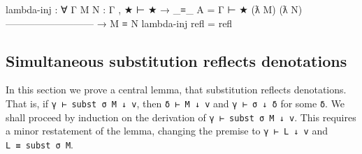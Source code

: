 \begin{fence}
\begin{code}
lambda-inj : ∀ {Γ} {M N : Γ , ★ ⊢ ★ }
  → _≡_ {A = Γ ⊢ ★} (ƛ M) (ƛ N)
    ---------------------------
  → M ≡ N
lambda-inj refl = refl
\end{code}
\end{fence}

\hypertarget{simultaneous-substitution-reflects-denotations}{%
\subsection{Simultaneous substitution reflects
denotations}\label{simultaneous-substitution-reflects-denotations}}

In this section we prove a central lemma, that substitution reflects
denotations. That is, if \texttt{γ\ ⊢\ subst\ σ\ M\ ↓\ v}, then
\texttt{δ\ ⊢\ M\ ↓\ v} and \texttt{γ\ ⊢\ σ\ ↓\ δ} for some \texttt{δ}.
We shall proceed by induction on the derivation of
\texttt{γ\ ⊢\ subst\ σ\ M\ ↓\ v}. This requires a minor restatement of
the lemma, changing the premise to \texttt{γ\ ⊢\ L\ ↓\ v} and
\texttt{L\ ≡\ subst\ σ\ M}.

